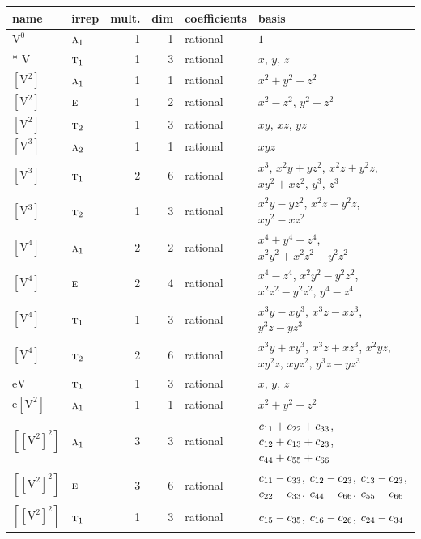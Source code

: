 \documentclass[10pt,a4paper]{article}
\numberwithin{equation}{section}
\newcommand{\irr}[1]{\text{\normalfont\scshape #1}}
\newcommand{\jahn}[1]{\mathrm{#1}}
\newlength{\fillwidth}\newlength{\cellwidth}\newlength{\colwidth}
\newcommand{\signbreak}{\penalty100\relax}
\begin{document}
{\begin{longtable}{@{}llrrl>{\RaggedRight\arraybackslash}p{\fillwidth}@{}}
name & irrep & mult. & dim & coefficients & basis\\\midrule\endhead
\bottomrule\endfoot\endlastfoot
$\jahn{V^{0}}$ & $\irr{a}_{1}$ & 1 & 1 & rational & $1$\\*
$\jahn{V}$ & $\irr{t}_{1}$ & 1 & 3 & rational & $x$, $y$, $z$\\
$\jahn{[V^{2}]}$ & $\irr{a}_{1}$ & 1 & 1 & rational & $x^{2} + y^{2} + z^{2}$\\
$\jahn{[V^{2}]}$ & $\irr{e}$ & 1 & 2 & rational & $x^{2} - z^{2}$, $y^{2} - z^{2}$\\
$\jahn{[V^{2}]}$ & $\irr{t}_{2}$ & 1 & 3 & rational & $xy$, $xz$, $yz$\\
$\jahn{[V^{3}]}$ & $\irr{a}_{2}$ & 1 & 1 & rational & $xyz$\\
$\jahn{[V^{3}]}$ & $\irr{t}_{1}$ & 2 & 6 & rational & $x^{3}$, $x^{2}y + yz^{2}$, $x^{2}z + y^{2}z$, $xy^{2} + xz^{2}$, $y^{3}$, $z^{3}$\\
$\jahn{[V^{3}]}$ & $\irr{t}_{2}$ & 1 & 3 & rational & $x^{2}y - yz^{2}$, $x^{2}z - y^{2}z$, $xy^{2} - xz^{2}$\\
$\jahn{[V^{4}]}$ & $\irr{a}_{1}$ & 2 & 2 & rational & $x^{4} + y^{4} + z^{4}$, $x^{2}y^{2} + x^{2}z^{2} + y^{2}z^{2}$\\
$\jahn{[V^{4}]}$ & $\irr{e}$ & 2 & 4 & rational & $x^{4} - z^{4}$, $x^{2}y^{2} - y^{2}z^{2}$, $x^{2}z^{2} - y^{2}z^{2}$, $y^{4} - z^{4}$\\
$\jahn{[V^{4}]}$ & $\irr{t}_{1}$ & 1 & 3 & rational & $x^{3}y - xy^{3}$, $x^{3}z - xz^{3}$, $y^{3}z - yz^{3}$\\
$\jahn{[V^{4}]}$ & $\irr{t}_{2}$ & 2 & 6 & rational & $x^{3}y + xy^{3}$, $x^{3}z + xz^{3}$, $x^{2}yz$, $xy^{2}z$, $xyz^{2}$, $y^{3}z + yz^{3}$\\
$\jahn{eV}$ & $\irr{t}_{1}$ & 1 & 3 & rational & $x$, $y$, $z$\\
$\jahn{e[V^{2}]}$ & $\irr{a}_{1}$ & 1 & 1 & rational & $x^{2} + y^{2} + z^{2}$\\
$\jahn{[[V^{2}]^{2}]}$ & $\irr{a}_{1}$ & 3 & 3 & rational & $c_{11} +\signbreak c_{22} +\signbreak c_{33}$, $c_{12} +\signbreak c_{13} +\signbreak c_{23}$, $c_{44} +\signbreak c_{55} +\signbreak c_{66}$\\
$\jahn{[[V^{2}]^{2}]}$ & $\irr{e}$ & 3 & 6 & rational & $c_{11} -\signbreak c_{33}$, $c_{12} -\signbreak c_{23}$, $c_{13} -\signbreak c_{23}$, $c_{22} -\signbreak c_{33}$, $c_{44} -\signbreak c_{66}$, $c_{55} -\signbreak c_{66}$\\
$\jahn{[[V^{2}]^{2}]}$ & $\irr{t}_{1}$ & 1 & 3 & rational & $c_{15} -\signbreak c_{35}$, $c_{16} -\signbreak c_{26}$, $c_{24} -\signbreak c_{34}$\\

\end{longtable}}
\end{document}
